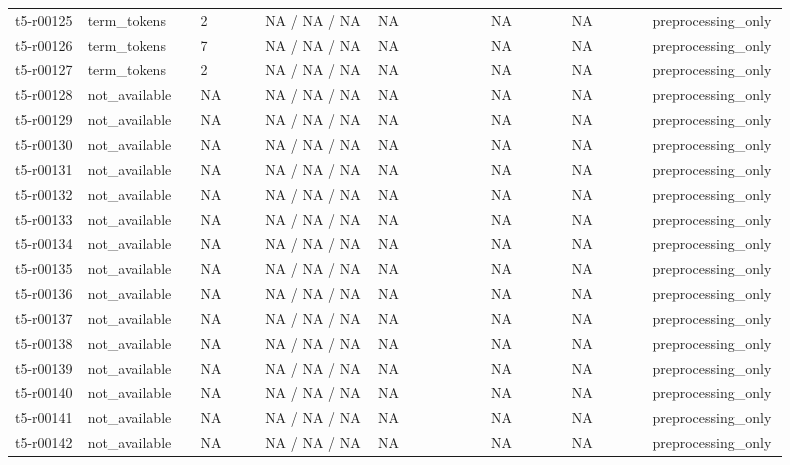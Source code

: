 \begin{longtable}{@{}p{0.09\linewidth}p{0.14\linewidth}p{0.08\linewidth}p{0.14\linewidth}p{0.14\linewidth}p{0.1\linewidth}p{0.1\linewidth}p{0.11\linewidth}@{}}
t5-r00125 & term\_\allowbreak{}tokens & 2 & NA / NA / NA & NA & NA & NA & preprocessing\_\allowbreak{}only \\
t5-r00126 & term\_\allowbreak{}tokens & 7 & NA / NA / NA & NA & NA & NA & preprocessing\_\allowbreak{}only \\
t5-r00127 & term\_\allowbreak{}tokens & 2 & NA / NA / NA & NA & NA & NA & preprocessing\_\allowbreak{}only \\
t5-r00128 & not\_\allowbreak{}available & NA & NA / NA / NA & NA & NA & NA & preprocessing\_\allowbreak{}only \\
t5-r00129 & not\_\allowbreak{}available & NA & NA / NA / NA & NA & NA & NA & preprocessing\_\allowbreak{}only \\
t5-r00130 & not\_\allowbreak{}available & NA & NA / NA / NA & NA & NA & NA & preprocessing\_\allowbreak{}only \\
t5-r00131 & not\_\allowbreak{}available & NA & NA / NA / NA & NA & NA & NA & preprocessing\_\allowbreak{}only \\
t5-r00132 & not\_\allowbreak{}available & NA & NA / NA / NA & NA & NA & NA & preprocessing\_\allowbreak{}only \\
t5-r00133 & not\_\allowbreak{}available & NA & NA / NA / NA & NA & NA & NA & preprocessing\_\allowbreak{}only \\
t5-r00134 & not\_\allowbreak{}available & NA & NA / NA / NA & NA & NA & NA & preprocessing\_\allowbreak{}only \\
t5-r00135 & not\_\allowbreak{}available & NA & NA / NA / NA & NA & NA & NA & preprocessing\_\allowbreak{}only \\
t5-r00136 & not\_\allowbreak{}available & NA & NA / NA / NA & NA & NA & NA & preprocessing\_\allowbreak{}only \\
t5-r00137 & not\_\allowbreak{}available & NA & NA / NA / NA & NA & NA & NA & preprocessing\_\allowbreak{}only \\
t5-r00138 & not\_\allowbreak{}available & NA & NA / NA / NA & NA & NA & NA & preprocessing\_\allowbreak{}only \\
t5-r00139 & not\_\allowbreak{}available & NA & NA / NA / NA & NA & NA & NA & preprocessing\_\allowbreak{}only \\
t5-r00140 & not\_\allowbreak{}available & NA & NA / NA / NA & NA & NA & NA & preprocessing\_\allowbreak{}only \\
t5-r00141 & not\_\allowbreak{}available & NA & NA / NA / NA & NA & NA & NA & preprocessing\_\allowbreak{}only \\
t5-r00142 & not\_\allowbreak{}available & NA & NA / NA / NA & NA & NA & NA & preprocessing\_\allowbreak{}only \\

\end{longtable}
